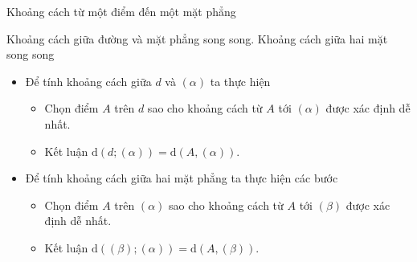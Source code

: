 \begin{dang}{Khoảng cách từ một điểm đến một mặt phẳng}
\begin{itemize}
\begin{tcolorbox}[colframe=red,colback=yellow!3!white,boxrule=0.2mm]
\begin{luuy}
{}
			\end{luuy}
		\end{tcolorbox}
	\end{itemize}
\end{dang}

\begin{dang}{Khoảng cách giữa đường và mặt phẳng song song. Khoảng cách giữa hai mặt song song}
	\begin{itemize}
		\item [\iconCH]  Để tính khoảng cách giữa $d$ và $(\alpha)$ ta thực hiện
		\begin{itemize}
			\item Chọn điểm $A$ trên $d$ sao cho khoảng cách từ $A$ tới $(\alpha)$ được xác định dễ nhất.
			\item Kết luận $\mathrm{d}(d; (\alpha))=\mathrm{d}(A, (\alpha))$.
		\end{itemize}
		\item [\iconCH]  Để tính khoảng cách giữa hai mặt phẳng ta thực hiện các bước
		\begin{itemize}
			\item Chọn điểm $A$ trên $(\alpha)$ sao cho khoảng cách từ $A$ tới $(\beta)$ được xác định dễ nhất.
			\item Kết luận $\mathrm{d}((\beta); (\alpha))=\mathrm{d}(A, (\beta))$.
		\end{itemize}
	\end{itemize}
\end{dang}

